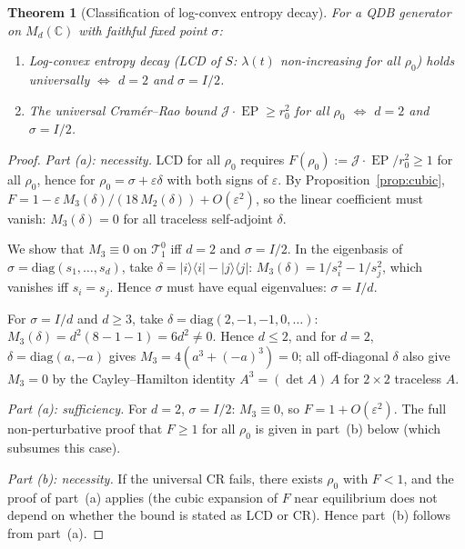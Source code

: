 \documentclass[11pt,a4paper]{article}
\newtheorem{theorem}{Theorem}[section]
\theoremstyle{definition}
\theoremstyle{remark}
\DeclareMathOperator{\EP}{EP}
\newcommand{\C}{\mathbb{C}}
\newcommand{\TT}{\mathcal{T}}
\begin{document}
\begin{theorem}[Classification of log-convex entropy
decay]\label{thm:LCD-class}
For a QDB generator on $M_d(\C)$ with faithful fixed point
$\sigma$:
\begin{enumerate}[label=\textup{(\alph*)}]
  \item Log-convex entropy decay (LCD of $S$: $\lambda(t)$
  non-increasing for all $\rho_0$) holds universally
  $\Longleftrightarrow$ $d = 2$ and $\sigma = I/2$.
  \item The universal Cram\'er--Rao bound
  $\mathcal{J}\cdot\EP \ge r_0^2$ for all $\rho_0$
  $\Longleftrightarrow$ $d = 2$ and $\sigma = I/2$.
\end{enumerate}
\end{theorem}

\begin{proof}
\emph{Part (a): necessity.}
LCD for all $\rho_0$ requires $F(\rho_0) :=
\mathcal{J}\cdot\EP/r_0^2 \ge 1$ for all
$\rho_0$, hence for $\rho_0 = \sigma + \varepsilon\delta$
with both signs of $\varepsilon$.  By
Proposition~\ref{prop:cubic}, $F = 1 -
\varepsilon\,M_3(\delta)/(18\,M_2(\delta)) + O(\varepsilon^2)$,
so the linear coefficient must vanish:
$M_3(\delta) = 0$ for all traceless self-adjoint $\delta$.

We show that $M_3 \equiv 0$ on $\TT_1^0$ iff $d = 2$
and $\sigma = I/2$.
In the eigenbasis of $\sigma = \mathrm{diag}(s_1,\ldots,s_d)$,
take $\delta = |i\rangle\!\langle i| - |j\rangle\!\langle j|$:
$M_3(\delta) = 1/s_i^2 - 1/s_j^2$, which vanishes iff
$s_i = s_j$.  Hence $\sigma$ must have equal eigenvalues:
$\sigma = I/d$.

For $\sigma = I/d$ and $d \ge 3$,
take $\delta = \mathrm{diag}(2,-1,-1,0,\ldots)$:
$M_3(\delta) = d^2(8 - 1 - 1) = 6d^2 \ne 0$.
Hence $d \le 2$, and for $d = 2$,
$\delta = \mathrm{diag}(a,-a)$ gives
$M_3 = 4(a^3 + (-a)^3) = 0$; all off-diagonal $\delta$
also give $M_3 = 0$ by the Cayley--Hamilton identity
$A^3 = (\det A)\,A$ for $2 \times 2$ traceless $A$.

\emph{Part (a): sufficiency.}
For $d = 2$, $\sigma = I/2$: $M_3 \equiv 0$, so
$F = 1 + O(\varepsilon^2)$.  The full non-perturbative proof
that $F \ge 1$ for all $\rho_0$ is given in part~(b) below
(which subsumes this case).

\emph{Part (b): necessity.}
If the universal CR fails, there exists $\rho_0$ with $F < 1$,
and the proof of part~(a) applies (the cubic expansion of $F$
near equilibrium does not depend on whether the bound is
stated as LCD or CR).  Hence part~(b) follows from part~(a).


\end{proof}
\end{document}
